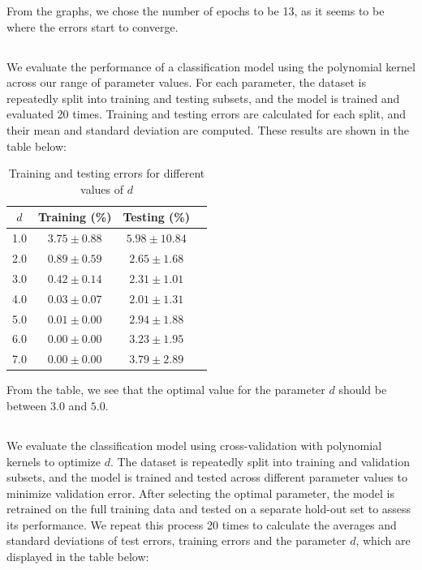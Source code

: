 \documentclass[final,3p,times,12pt]{article}
\begin{document}
From the graphs, we chose the number of epochs to be 13, as it seems to be where the errors start to converge. 

\subsection{}

We evaluate the performance of a classification model using the polynomial kernel across our range of parameter values. For each parameter, the dataset is repeatedly split into training and testing subsets, and the model is trained and evaluated 20 times. Training and testing errors are calculated for each split, and their mean and standard deviation are computed. These results are shown in the table below: 

\begin{table}[H]
\centering
\caption{Training and testing errors for different values of $d$}
\begin{tabular}{cccc}
\toprule
$d$ & Training (\%) & Testing (\%) \\
\midrule
1.0 & $3.75 \pm 0.88$ & $5.98 \pm 10.84$ \\
2.0 & $0.89 \pm 0.59$ & $2.65 \pm 1.68$ \\
3.0 & $0.42 \pm 0.14$ & $2.31 \pm 1.01$ \\
4.0 & $0.03 \pm 0.07$ & $2.01 \pm 1.31$ \\
5.0 & $0.01 \pm 0.00$ & $2.94 \pm 1.88$ \\
6.0 & $0.00 \pm 0.00$ & $3.23 \pm 1.95$ \\
7.0 & $0.00 \pm 0.00$ & $3.79 \pm 2.89$ \\
\bottomrule
\end{tabular}
\end{table}

From the table, we see that the optimal value for the parameter $d$ should be between $3.0$ and $5.0$. 

\subsection{}

We evaluate the classification model using cross-validation with polynomial kernels to optimize $d$. The dataset is repeatedly split into training and validation subsets, and the model is trained and tested across different parameter values to minimize validation error. After selecting the optimal parameter, the model is retrained on the full training data and tested on a separate hold-out set to assess its performance. We repeat this process 20 times to calculate the averages and standard deviations of test errors, training errors and the parameter $d$, which are displayed in the table below:
\end{document}
